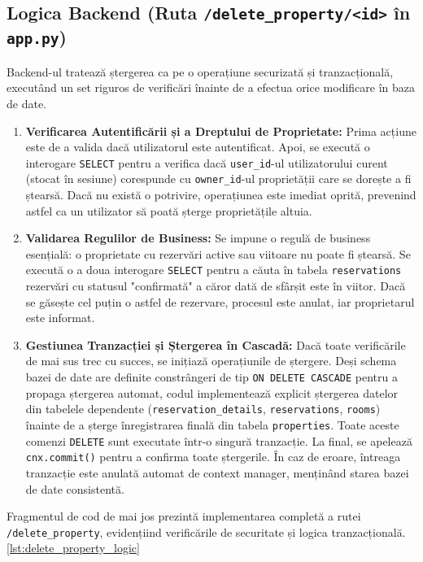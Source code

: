 \documentclass[12pt, a4paper, oneside, romanian]{teza-upb}
\begin{document}
\subsection{Logica Backend (Ruta \texttt{/delete\_property/<id>} în \texttt{app.py})}
Backend-ul tratează ștergerea ca pe o operațiune securizată și tranzacțională, executând un set riguros de verificări înainte de a efectua orice modificare în baza de date.
\begin{enumerate}
	\item \textbf{Verificarea Autentificării și a Dreptului de Proprietate:} Prima acțiune este de a valida dacă utilizatorul este autentificat. Apoi, se execută o interogare \texttt{SELECT} pentru a verifica dacă \texttt{user\_id}-ul utilizatorului curent (stocat în sesiune) corespunde cu \texttt{owner\_id}-ul proprietății care se dorește a fi ștearsă. Dacă nu există o potrivire, operațiunea este imediat oprită, prevenind astfel ca un utilizator să poată șterge proprietățile altuia.
	
	\item \textbf{Validarea Regulilor de Business:} Se impune o regulă de business esențială: o proprietate cu rezervări active sau viitoare nu poate fi ștearsă. Se execută o a doua interogare \texttt{SELECT} pentru a căuta în tabela \texttt{reservations} rezervări cu statusul "confirmată" a căror dată de sfârșit este în viitor. Dacă se găsește cel puțin o astfel de rezervare, procesul este anulat, iar proprietarul este informat.
	
	\item \textbf{Gestiunea Tranzacției și Ștergerea în Cascadă:} Dacă toate verificările de mai sus trec cu succes, se inițiază operațiunile de ștergere. Deși schema bazei de date are definite constrângeri de tip \texttt{ON DELETE CASCADE} pentru a propaga ștergerea automat, codul implementează explicit ștergerea datelor din tabelele dependente (\texttt{reservation\_details}, \texttt{reservations}, \texttt{rooms}) înainte de a șterge înregistrarea finală din tabela \texttt{properties}. Toate aceste comenzi \texttt{DELETE} sunt executate într-o singură tranzacție. La final, se apelează \texttt{cnx.commit()} pentru a confirma toate ștergerile. În caz de eroare, întreaga tranzacție este anulată automat de context manager, menținând starea bazei de date consistentă.
\end{enumerate}


Fragmentul de cod de mai jos prezintă implementarea completă a rutei \texttt{/delete\_property}, evidențiind verificările de securitate și logica tranzacțională. \ref{lst:delete_property_logic}
 
\end{document}
